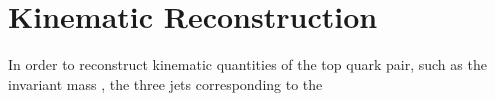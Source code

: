 \chapter{Kinematic Reconstruction}
\label{sec:reco}

In order to reconstruct kinematic quantities of the top quark pair,
such as the invariant mass , the
three jets corresponding to the 
